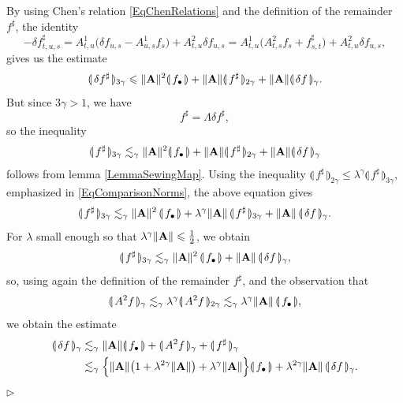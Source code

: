 \documentclass[11pt,a4paper]{amsart}
\renewcommand{\leq}{\leqslant}
\numberwithin{equation}{section} %
\newenvironment{Dem}{%
    \begin{list}{\hspace{0.5cm}{\sc Proof --}}{%
        \setlength{\topsep}{0pt}%
        \setlength{\leftmargin}{0pt}%
        \setlength{\rightmargin}{0pt}%
        \setlength{\listparindent}{0pt}%
        \setlength{\itemindent}{0pt}%
        \setlength{\parsep}{0pt}%
        \addtolength{\leftmargin}{20pt}%
        \addtolength{\rightmargin}{0pt}%
    } \item }{\hfill{\space $\rhd$}\end{list}\smallskip}
\begin{document}
\begin{Dem}
By using Chen's relation \eqref{EqChenRelations} and the definition of the remainder $f^\sharp$, the identity
$$
- \delta f^\sharp_{t, u, s} = A^1_{t, u} \Big(\delta f_{u, s}  -A^1_{u, s} f_s\Big) +A^2_{t, u} \delta f_{u, s} = A^1_{t, u} \Big(A^2_{t, s} f_s + f^{\sharp}_{s, t}\Big) + A^2_{t, u} \delta f_{u, s}, 
$$
gives us the estimate
$$
\llparenthesis\, \delta f^{\sharp} \,\rrparenthesis_{3 \gamma} \leq \| {\bf A} \| ^2 \llparenthesis\, f_\bullet \,\rrparenthesis + \| {\bf A} \| \llparenthesis\, f^{\sharp} \,\rrparenthesis_{2 \gamma} + \| {\bf A} \| \llparenthesis\, \delta f \,\rrparenthesis_\gamma.
$$ 
But since $3 \gamma > 1$, we have 
$$
f^{\sharp} = \Lambda \delta f^{\sharp},
$$ 
so the inequality
$$
\llparenthesis\, f^{\sharp} \,\rrparenthesis_{3 \gamma} \lesssim_\gamma \| {\bf A} \|^2 \llparenthesis\, f_\bullet \,\rrparenthesis + \| {\bf A} \| \llparenthesis\, f^{\sharp} \,\rrparenthesis_{2 \gamma} + \| {\bf A} \| \llparenthesis\, \delta f \,\rrparenthesis_\gamma
$$
follows from lemma \ref{LemmaSewingMap}. Using the inequality $\llparenthesis\,  f^{\sharp} \,\rrparenthesis_{2 \gamma} \leq \lambda^\gamma \llparenthesis\,  f^{\sharp} \,\rrparenthesis_{3 \gamma}$, emphasized in \eqref{EqComparisonNorms}, the above equation gives 
$$
\llparenthesis\,  f^{\sharp} \,\rrparenthesis_{3 \gamma} \lesssim_\gamma \| {\bf A} \|^2\, \llparenthesis\,  f_\bullet \,\rrparenthesis  + \lambda^\gamma \| {\bf A} \|\,\llparenthesis\,  f^{\sharp}\,\rrparenthesis_{3 \gamma} + \| {\bf A} \|\, \llparenthesis\, \delta f \,\rrparenthesis_\gamma.
$$
For $\lambda$ small enough so that $\lambda^\gamma \| {\bf A} \| \leq \frac{1}{2}$, we obtain
$$
\llparenthesis\,  f^{\sharp} \,\rrparenthesis_{3 \gamma} \lesssim_{\gamma} \| {\bf A} \|^2\, \llparenthesis\,  f_\bullet \,\rrparenthesis  + \| {\bf A} \|\, \llparenthesis\, \delta f \,\rrparenthesis_\gamma,
$$
so, using again the definition of the remainder $f^\sharp$, and the observation that 
$$
\llparenthesis\, A^2 f\,\rrparenthesis_{\gamma} \lesssim_{\gamma}  \lambda^\gamma \llparenthesis\, A^2 f\,\rrparenthesis_{2 \gamma} \lesssim_{\gamma} \lambda^\gamma \| {\bf A} \|\, \llparenthesis\, f_\bullet \,\rrparenthesis,
$$
we obtain the estimate
\begin{equation*}
\begin{split}
\llparenthesis\, \delta f \,\rrparenthesis_\gamma &\lesssim_{\gamma} \| {\bf A} \|\llparenthesis\,f_\bullet \,\rrparenthesis + \llparenthesis\, A^2 f\,\rrparenthesis_\gamma + \llparenthesis\, f^{\sharp}\,\rrparenthesis_\gamma \\
                            &\lesssim_{\gamma} \Big\{\| {\bf A} \| \big(1 + \lambda^{2 \gamma}\| {\bf A} \|\big) + \lambda^\gamma \| {\bf A} \|\Big\} \llparenthesis\, f_\bullet \,\rrparenthesis + \lambda^{2 \gamma}\| {\bf A} \|\,\llparenthesis\, \delta f \,\rrparenthesis_{\gamma}.

\end{split}
\end{equation*}
\end{Dem}
\end{document}
